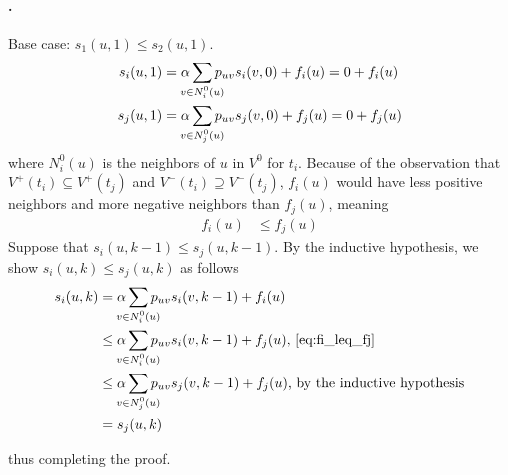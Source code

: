 \paragraph{\sinksource.}
Base case: $s_1(u,1) \leq s_2(u,1)$.
\begin{align}
    s_i(u,1) &= \alpha \sum_{\mathclap{v \in N^0_i(u)}} p_{uv}s_i(v,0)  + f_i(u) = 0 + f_i(u) \\
    s_j(u,1) &= \alpha \sum_{\mathclap{v \in N^0_j(u)}} p_{uv}s_j(v,0)  + f_j(u) = 0 + f_j(u)
\end{align}
where $N^0_i(u)$ is the neighbors of $u$ in $V^0$ for $t_i$.
Because of the observation that $V^+(t_i) \subseteq V^+(t_j)$ and $V^-(t_i) \supseteq V^-(t_j)$, $f_i(u)$ would have less positive neighbors and more negative neighbors than $f_j(u)$, meaning
\begin{align}
      f_i(u) &\leq f_j(u) \label{eq:fi_leq_fj}%
\end{align}
Suppose that $s_i(u,k-1) \leq s_j(u,k-1)$.
By the inductive hypothesis, we show $s_i(u,k) \leq s_j(u,k)$ as follows
\begin{align}
    s_i(u,k) &= \alpha \sum_{\mathclap{v \in N^0_i(u)}} p_{uv}s_i(v,k-1) + f_i(u)  \\
          &\leq \alpha \sum_{\mathclap{v \in N^0_i(u)}} p_{uv}s_i(v,k-1) + f_j(u) \text{, \cref{eq:fi_leq_fj}} \\
          &\leq \alpha \sum_{\mathclap{v \in N^0_j(u)}} p_{uv}s_j(v,k-1) + f_j(u) \text{, by the inductive hypothesis} \\
             &= s_j(u,k)
\end{align}

thus completing the proof.



